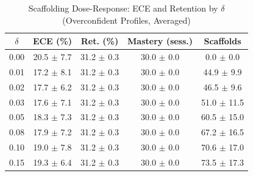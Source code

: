 \begin{table}[t]
\centering
\scriptsize
\setlength{\tabcolsep}{3pt}
\caption{Scaffolding Dose-Response: ECE and Retention by $\delta$ (Overconfident Profiles, Averaged)}
\label{tab:delta}
\begin{tabular}{ccccc}
\toprule
$\delta$ & \textbf{ECE (\%)} & \textbf{Ret. (\%)} & \textbf{Mastery (sess.)} & \textbf{Scaffolds} \\
\midrule
0.00 & 20.5 $\pm$ 7.7 & 31.2 $\pm$ 0.3 & 30.0 $\pm$ 0.0 & 0.0 $\pm$ 0.0 \\
0.01 & 17.2 $\pm$ 8.1 & 31.2 $\pm$ 0.3 & 30.0 $\pm$ 0.0 & 44.9 $\pm$ 9.9 \\
0.02 & 17.7 $\pm$ 6.2 & 31.2 $\pm$ 0.3 & 30.0 $\pm$ 0.0 & 46.5 $\pm$ 9.6 \\
0.03 & 17.6 $\pm$ 7.1 & 31.2 $\pm$ 0.3 & 30.0 $\pm$ 0.0 & 51.0 $\pm$ 11.5 \\
0.05 & 18.3 $\pm$ 7.3 & 31.2 $\pm$ 0.3 & 30.0 $\pm$ 0.0 & 60.5 $\pm$ 15.0 \\
0.08 & 17.9 $\pm$ 7.2 & 31.2 $\pm$ 0.3 & 30.0 $\pm$ 0.0 & 67.2 $\pm$ 16.5 \\
0.10 & 19.0 $\pm$ 7.8 & 31.2 $\pm$ 0.3 & 30.0 $\pm$ 0.0 & 70.6 $\pm$ 17.0 \\
0.15 & 19.3 $\pm$ 6.4 & 31.2 $\pm$ 0.3 & 30.0 $\pm$ 0.0 & 73.5 $\pm$ 17.3 \\
\bottomrule
\end{tabular}
\end{table}
